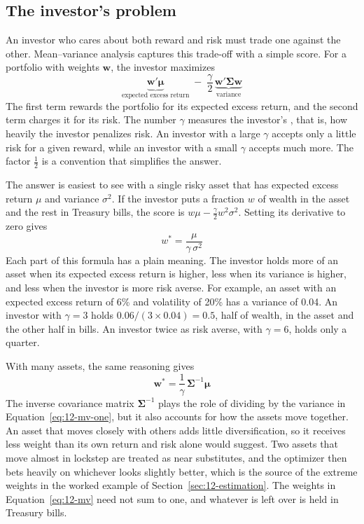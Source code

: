 \subsection{The investor's problem}
\label{sec:12-problem}

An investor who cares about both reward and risk must trade one against the other. Mean--variance analysis captures this trade-off with a simple score. For a portfolio with weights $\mathbf{w}$, the investor maximizes
\begin{equation}
  \underbrace{\mathbf{w}'\boldsymbol{\mu}}_{\text{expected excess return}} \; - \; \frac{\gamma}{2}\,\underbrace{\mathbf{w}'\boldsymbol{\Sigma}\mathbf{w}}_{\text{variance}}
  \label{eq:12-mv-objective}
\end{equation}
The first term rewards the portfolio for its expected excess return, and the second term charges it for its risk. The number $\gamma$ measures the investor's , that is, how heavily the investor penalizes risk. An investor with a large $\gamma$ accepts only a little risk for a given reward, while an investor with a small $\gamma$ accepts much more. The factor $\tfrac{1}{2}$ is a convention that simplifies the answer.

The answer is easiest to see with a single risky asset that has expected excess return $\mu$ and variance $\sigma^2$. If the investor puts a fraction $w$ of wealth in the asset and the rest in Treasury bills, the score is $w\mu - \tfrac{\gamma}{2} w^2 \sigma^2$. Setting its derivative to zero gives
\begin{equation}
  w^* = \frac{\mu}{\gamma\,\sigma^2}
  \label{eq:12-mv-one}
\end{equation}
Each part of this formula has a plain meaning. The investor holds more of an asset when its expected excess return is higher, less when its variance is higher, and less when the investor is more risk averse. For example, an asset with an expected excess return of 6\% and volatility of 20\% has a variance of 0.04. An investor with $\gamma = 3$ holds $0.06/(3 \times 0.04) = 0.5$, half of wealth, in the asset and the other half in bills. An investor twice as risk averse, with $\gamma = 6$, holds only a quarter.

With many assets, the same reasoning gives
\begin{equation}
  \mathbf{w}^* = \frac{1}{\gamma}\,\boldsymbol{\Sigma}^{-1}\boldsymbol{\mu}
  \label{eq:12-mv}
\end{equation}
The inverse covariance matrix $\boldsymbol{\Sigma}^{-1}$ plays the role of dividing by the variance in Equation~\eqref{eq:12-mv-one}, but it also accounts for how the assets move together. An asset that moves closely with others adds little diversification, so it receives less weight than its own return and risk alone would suggest. Two assets that move almost in lockstep are treated as near substitutes, and the optimizer then bets heavily on whichever looks slightly better, which is the source of the extreme weights in the worked example of Section~\ref{sec:12-estimation}. The weights in Equation~\eqref{eq:12-mv} need not sum to one, and whatever is left over is held in Treasury bills.

